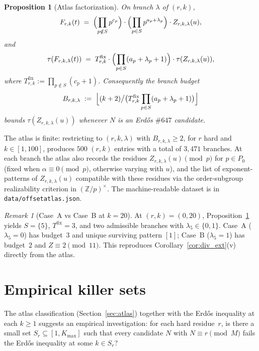 \documentclass[11pt]{article}
\renewcommand{\_}{\origunderscore\allowbreak}
\newtheorem{proposition}[theorem]{Proposition}
\theoremstyle{definition}
\theoremstyle{remark}
\newtheorem{remark}[theorem]{Remark}
\begin{document}
\begin{proposition}[Atlas factorization]\label{prop:atlas_factorization}
On branch $\lambda$ of $(r,k)$,
\[
  F_{r,k}(t)
  \;=\;
  \Bigl(\prod_{p\notin S}p^{c_p}\Bigr)
  \cdot
  \Bigl(\prod_{p\in S}p^{a_p+\lambda_p}\Bigr)
  \cdot
  Z_{r,k,\lambda}(u),
\]
and
\[
  \tau(F_{r,k,\lambda}(t))
  \;=\;
  T^{\mathrm{fix}}_{r,k}\cdot\Bigl(\prod_{p\in S}(a_p+\lambda_p+1)\Bigr)\cdot\tau(Z_{r,k,\lambda}(u)),
\]
where $T^{\mathrm{fix}}_{r,k}:=\prod_{p\notin S}(c_p+1)$. Consequently
the branch budget
\[
  B_{r,k,\lambda}
  \;:=\;
  \Bigl\lfloor (k+2)\bigl/\bigl(T^{\mathrm{fix}}_{r,k}\prod_{p\in S}(a_p+\lambda_p+1)\bigr)\Bigr\rfloor
\]
bounds $\tau(Z_{r,k,\lambda}(u))$ whenever $N$ is an Erd\H{o}s
$\#647$ candidate.
\end{proposition}

The atlas is finite: restricting to $(r,k,\lambda)$ with
$B_{r,k,\lambda}\ge 2$, for $r$ hard and $k\in[1,100]$, produces
$500$ $(r,k)$ entries with a total of $3{,}471$ branches. At each
branch the atlas also records the residues $Z_{r,k,\lambda}(u)\pmod p$
for $p\in P_0$ (fixed when $\alpha\equiv 0\pmod p$, otherwise
varying with $u$), and the list of exponent-patterns of
$Z_{r,k,\lambda}(u)$ compatible with these residues via the
order-subgroup realizability criterion in $(\mathbb{Z}/p)^{\times}$.
The machine-readable dataset is in \texttt{data/offset\_atlas.json}.

\begin{remark}[Case~A vs Case~B at $k=20$]
At $(r,k)=(0,20)$, Proposition~\ref{prop:atlas_factorization} yields
$S=\{5\}$, $T^{\mathrm{fix}}=3$, and two admissible branches with
$\lambda_5\in\{0,1\}$. Case~A ($\lambda_5=0$) has budget~$3$ and
unique surviving pattern $[1]$; Case~B ($\lambda_5=1$) has budget~$2$
and $Z\equiv 2\pmod{11}$. This reproduces
Corollary~\ref{cor:div_ext}(v) directly from the atlas.
\end{remark}

\section{Empirical killer sets}\label{sec:killer_sets}

The atlas classification (Section~\ref{sec:atlas}) together with the
Erd\H{o}s inequality at each $k\ge 1$ suggests an empirical
investigation: for each hard residue~$r$, is there a small set
$S_r\subseteq[1,K_{\max}]$ such that every candidate $N$ with
$N\equiv r\pmod M$ fails the Erd\H{o}s inequality at some $k\in S_r$?
\end{document}
